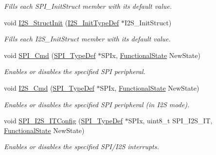 \begin{DoxyCompactItemize}
\begin{DoxyCompactList}\small\item\em Fills each S\+P\+I\+\_\+\+Init\+Struct member with its default value. \end{DoxyCompactList}\item 
void \mbox{\hyperlink{group___s_p_i___exported___functions_ga7470ec1d0759fdeeb42c7fe71a3b41b7}{I2\+S\+\_\+\+Struct\+Init}} (\mbox{\hyperlink{struct_i2_s___init_type_def}{I2\+S\+\_\+\+Init\+Type\+Def}} $\ast$I2\+S\+\_\+\+Init\+Struct)
\begin{DoxyCompactList}\small\item\em Fills each I2\+S\+\_\+\+Init\+Struct member with its default value. \end{DoxyCompactList}\item 
void \mbox{\hyperlink{group___s_p_i___exported___functions_gaa31357879a65ee1ed7223f3b9114dcf3}{S\+P\+I\+\_\+\+Cmd}} (\mbox{\hyperlink{struct_s_p_i___type_def}{S\+P\+I\+\_\+\+Type\+Def}} $\ast$S\+P\+Ix, \mbox{\hyperlink{group___exported__types_gac9a7e9a35d2513ec15c3b537aaa4fba1}{Functional\+State}} New\+State)
\begin{DoxyCompactList}\small\item\em Enables or disables the specified S\+PI peripheral. \end{DoxyCompactList}\item 
void \mbox{\hyperlink{group___s_p_i___exported___functions_gafe061c71bbc5b4224f3f2884dc53739e}{I2\+S\+\_\+\+Cmd}} (\mbox{\hyperlink{struct_s_p_i___type_def}{S\+P\+I\+\_\+\+Type\+Def}} $\ast$S\+P\+Ix, \mbox{\hyperlink{group___exported__types_gac9a7e9a35d2513ec15c3b537aaa4fba1}{Functional\+State}} New\+State)
\begin{DoxyCompactList}\small\item\em Enables or disables the specified S\+PI peripheral (in I2S mode). \end{DoxyCompactList}\item 
void \mbox{\hyperlink{group___s_p_i___exported___functions_ga17f4ef132e8ddbf94cb6b1688d181e41}{S\+P\+I\+\_\+\+I2\+S\+\_\+\+I\+T\+Config}} (\mbox{\hyperlink{struct_s_p_i___type_def}{S\+P\+I\+\_\+\+Type\+Def}} $\ast$S\+P\+Ix, uint8\+\_\+t S\+P\+I\+\_\+\+I2\+S\+\_\+\+IT, \mbox{\hyperlink{group___exported__types_gac9a7e9a35d2513ec15c3b537aaa4fba1}{Functional\+State}} New\+State)
\begin{DoxyCompactList}\small\item\em Enables or disables the specified S\+P\+I/\+I2S interrupts. \end{DoxyCompactList}\item 

\end{DoxyCompactItemize}
